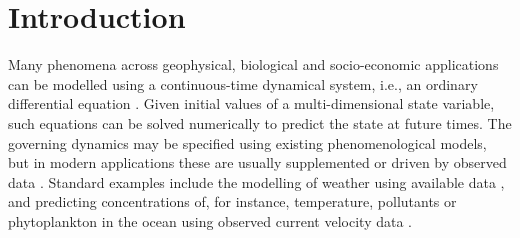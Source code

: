 
\chapter{Introduction}
Many phenomena across geophysical, biological and socio-economic applications can be modelled using a continuous-time dynamical system, i.e., an ordinary differential equation \cite[e.g.]{BrauerCastillo-Chavez_2012_MathematicalModelsPopulation,TelEtAl_2005_ChemicalBiologicalActivity,Wiggins_2005_DynamicalSystemsApproach}.
Given initial values of a multi-dimensional state variable, such equations can be solved numerically to predict the state at future times.
The governing dynamics may be specified using existing phenomenological models, but in modern applications these are usually supplemented or driven by observed data \cite{LawEtAl_2015_DataAssimilationMathematical,ReichCotter_2015_ProbabilisticForecastingBayesian}.
Standard examples include the modelling of weather using available data \cite{LawEtAl_2015_DataAssimilationMathematical,ReichCotter_2015_ProbabilisticForecastingBayesian}, and predicting concentrations of, for instance, temperature, pollutants or phytoplankton in the ocean using observed current velocity data \cite{AbascalEtAl_2009_ApplicationHFRadar,dOvidioEtAl_2010_FluidDynamicalNiches}.








